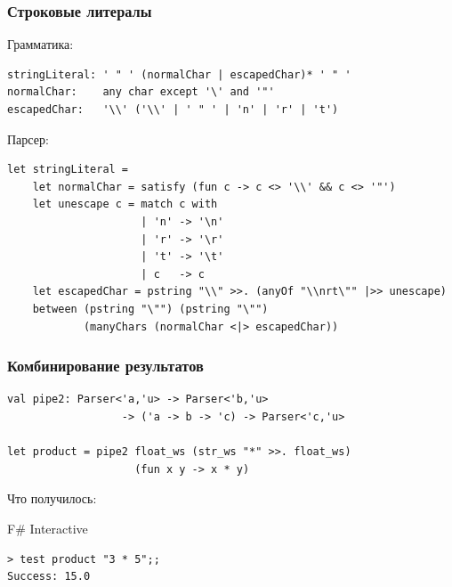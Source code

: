 \documentclass[xetex,mathserif,serif]{beamer}
\begin{document}
    \begin{frame}[fragile]
        \frametitle{Строковые литералы}
        \begin{small}
            Грамматика:
            \begin{verbatim}
stringLiteral: ' " ' (normalChar | escapedChar)* ' " '
normalChar:    any char except '\' and '"'
escapedChar:   '\\' ('\\' | ' " ' | 'n' | 'r' | 't')
            \end{verbatim}
            Парсер:
            \begin{verbatim}
let stringLiteral =
    let normalChar = satisfy (fun c -> c <> '\\' && c <> '"')
    let unescape c = match c with
                     | 'n' -> '\n'
                     | 'r' -> '\r'
                     | 't' -> '\t'
                     | c   -> c
    let escapedChar = pstring "\\" >>. (anyOf "\\nrt\"" |>> unescape)
    between (pstring "\"") (pstring "\"")
            (manyChars (normalChar <|> escapedChar))
            \end{verbatim}
        \end{small}
    \end{frame}

    \begin{frame}[fragile]
        \frametitle{Комбинирование результатов}
        \begin{verbatim}
val pipe2: Parser<'a,'u> -> Parser<'b,'u> 
                  -> ('a -> b -> 'c) -> Parser<'c,'u>

let product = pipe2 float_ws (str_ws "*" >>. float_ws)
                    (fun x y -> x * y)
        \end{verbatim}
        Что получилось:
        \begin{alertblock}{F\# Interactive}
            \begin{verbatim}
> test product "3 * 5";;
Success: 15.0
            \end{verbatim}
        \end{alertblock}
    \end{frame}
\end{document}
